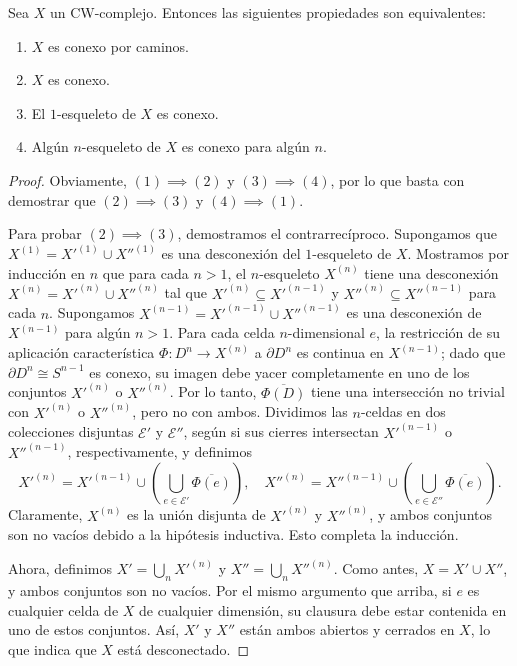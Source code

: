 \begin{teorema}
	Sea \(X\) un CW-complejo. Entonces las siguientes propiedades son equivalentes:
	\begin{enumerate}
		\item \(X\) es conexo por caminos.
		\item \(X\) es conexo.
		\item El \(1\)-esqueleto de \(X\) es conexo.
		\item Algún \(n\)-esqueleto de \(X\) es conexo para algún \(n\).
	\end{enumerate}
\end{teorema}
\begin{proof}
	Obviamente, \((1) \implies (2)\) y \((3) \implies (4)\), por lo que basta con demostrar que \((2) \implies (3)\) y \((4) \implies (1)\).
	
	Para probar \((2) \implies (3)\), demostramos el contrarrecíproco. Supongamos que \(X^{(1)} = X'^{(1)} \cup X''^{(1)}\) es una desconexión del \(1\)-esqueleto de \(X\). Mostramos por inducción en \(n\) que para cada \(n > 1\), el \(n\)-esqueleto \(X^{(n)}\) tiene una desconexión \(X^{(n)} = X'^{(n)} \cup X''^{(n)}\) tal que \(X'^{(n)} \subseteq X'^{(n-1)}\) y \(X''^{(n)} \subseteq X''^{(n-1)}\) para cada \(n\). Supongamos \(X^{(n-1)} = X'^{(n-1)} \cup X''^{(n-1)}\) es una desconexión de \(X^{(n-1)}\) para algún \(n > 1\). Para cada celda \(n\)-dimensional \(e\), la restricción de su aplicación característica \(\Phi \colon D^n \to X^{(n)}\) a \(\partial D^n\) es continua en \(X^{(n-1)}\); dado que \(\partial D^n \cong S^{n-1}\) es conexo, su imagen debe yacer completamente en uno de los conjuntos \(X'^{(n)}\) o \(X''^{(n)}\). Por lo tanto, \(\overline{\Phi(D)}\) tiene una intersección no trivial con \(X'^{(n)}\) o \(X''^{(n)}\), pero no con ambos. Dividimos las \(n\)-celdas en dos colecciones disjuntas \(\mathcal{E}'\) y \(\mathcal{E}''\), según si sus cierres intersectan \(X'^{(n-1)}\) o \(X''^{(n-1)}\), respectivamente, y definimos
	\[
	X'^{(n)} = X'^{(n-1)} \cup \left(\bigcup_{e \in \mathcal{E}'} \overline{\Phi(e)} \right),\quad
	X''^{(n)} = X''^{(n-1)} \cup \left(\bigcup_{e \in \mathcal{E}''} \overline{\Phi(e)} \right).
	\]
	Claramente, \(X^{(n)}\) es la unión disjunta de \(X'^{(n)}\) y \(X''^{(n)}\), y ambos conjuntos son no vacíos debido a la hipótesis inductiva. Esto completa la inducción.
	
	Ahora, definimos \(X' = \bigcup_n X'^{(n)}\) y \(X'' = \bigcup_n X''^{(n)}\). Como antes, \(X = X' \cup X''\), y ambos conjuntos son no vacíos. Por el mismo argumento que arriba, si \(e\) es cualquier celda de \(X\) de cualquier dimensión, su clausura debe estar contenida en uno de estos conjuntos. Así, \(X'\) y \(X''\) están ambos abiertos y cerrados en \(X\), lo que indica que \(X\) está desconectado.
	

\end{proof}
